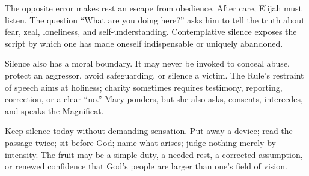 The opposite error makes rest an escape from obedience. After care, Elijah must listen. The question ``What are you doing here?'' asks him to tell the truth about fear, zeal, loneliness, and self-understanding. Contemplative silence exposes the script by which one has made oneself indispensable or uniquely abandoned.

Silence also has a moral boundary. It may never be invoked to conceal abuse, protect an aggressor, avoid safeguarding, or silence a victim. The Rule's restraint of speech aims at holiness; charity sometimes requires testimony, reporting, correction, or a clear ``no.'' Mary ponders, but she also asks, consents, intercedes, and speaks the Magnificat.

Keep silence today without demanding sensation. Put away a device; read the passage twice; sit before God; name what arises; judge nothing merely by intensity. The fruit may be a simple duty, a needed rest, a corrected assumption, or renewed confidence that God's people are larger than one's field of vision.




